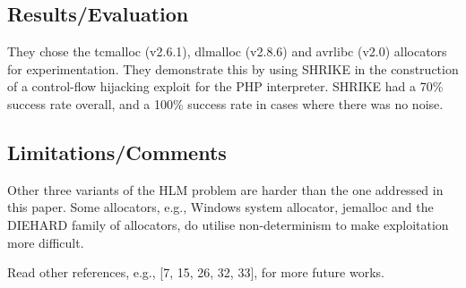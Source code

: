 \subsection{Results/Evaluation}
 They chose the tcmalloc (v2.6.1), dlmalloc (v2.8.6) and avrlibc (v2.0) allocators for experimentation.  They demonstrate this by using SHRIKE in the construction of a control-flow hijacking exploit for the PHP interpreter.  SHRIKE had a 70\% success rate overall, and a 100\% success rate in cases where there was no noise.
\subsection{Limitations/Comments}
Other three variants of the HLM problem are harder than the one addressed in this paper. Some allocators, e.g., Windows system allocator, jemalloc and the DIEHARD family of allocators, do utilise non-determinism to make exploitation more difficult.

Read other references, e.g., [7, 15, 26, 32, 33], for more future works.
\newpage

